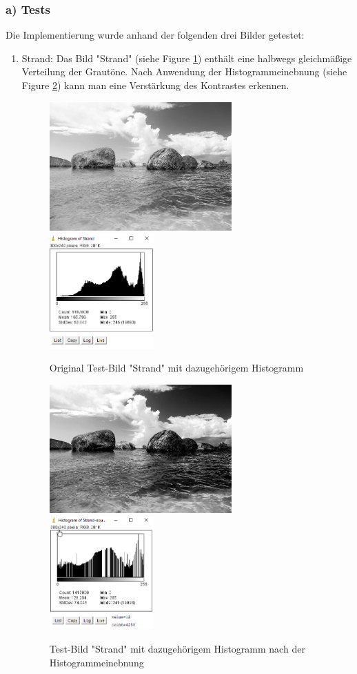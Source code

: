 \documentclass[12pt,german]{article}
\begin{document}
\subsubsection{a) Tests}
Die Implementierung wurde anhand der folgenden drei Bilder getestet:
\begin{enumerate}
\item Strand: 
Das Bild "Strand" (siehe Figure \ref{fig:Strand01}) enthält eine halbwegs gleichmäßige Verteilung der Grautöne. Nach Anwendung der Histogrammeinebnung  (siehe Figure \ref{fig:Strand02}) kann man eine Verstärkung des Kontrastes erkennen.
\begin{figure}[H] \centering
	\includegraphics[width=7cm]{../testData/Results/Strand/Strand.jpg}
	\includegraphics[width=4cm]{../testData/Results/Strand/Strand-histogram.png}
	\caption{Original Test-Bild "Strand" mit dazugehörigem Histogramm}
	 \label{fig:Strand01}
\end{figure}
\begin{figure}[H] \centering
	\includegraphics[width=7cm]{../testData/Results/Strand/Strand-equalized.jpg}
	\includegraphics[width=4cm]{../testData/Results/Strand/Strand-equalized-histogram.png}
	\caption{Test-Bild "Strand" mit dazugehörigem Histogramm nach der Histogrammeinebnung}
	 \label{fig:Strand02}
\end{figure}


\end{enumerate}
\end{document}
